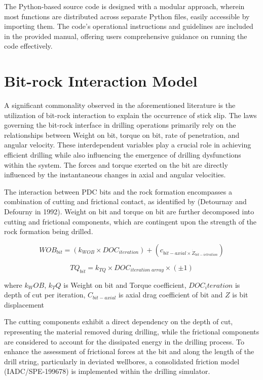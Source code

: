 The Python-based source code is designed with a modular approach, wherein most functions are distributed across separate Python files, easily accessible by importing them. The code's operational instructions and guidelines are included in the provided manual, offering users comprehensive guidance on running the code effectively.

\section{Bit-rock Interaction Model}

A significant commonality observed in the aforementioned literature is the utilization of bit-rock interaction to explain the occurrence of stick slip. The laws governing the bit-rock interface in drilling operations primarily rely on the relationships between Weight on bit, torque on bit, rate of penetration, and angular velocity. These interdependent variables play a crucial role in achieving efficient drilling while also influencing the emergence of drilling dysfunctions within the system. The forces and torque exerted on the bit are directly influenced by the instantaneous changes in axial and angular velocities.

The interaction between PDC bits and the rock formation encompasses a combination of cutting and frictional contact, as identified by (Detournay and Defourny in 1992). Weight on bit and torque on bit are further decomposed into cutting and frictional components, which are contingent upon the strength of the rock formation being drilled.

\begin{equation}\label{WOB}
  WOB_{bit} = (k_{WOB}\times DOC_{iteration}) + (c_{bit-axial\times \dot{Z}_{bit-ietration}})
\end{equation}

\begin{equation}\label{Torque}
  TQ_{bit} = k_{TQ}\times DOC_{iteration\; array}\times (\pm1)
\end{equation}

where $k_WOB$, $k_TQ$ is Weight on bit and Torque coefficient, $DOC_iteration$ is depth of cut per iteration, $C_{bit-axial}$ is axial drag coefficient of bit and $Z$ is bit displacement 

The cutting components exhibit a direct dependency on the depth of cut, representing the material removed during drilling, while the frictional components are considered to account for the dissipated energy in the drilling process. To enhance the assessment of frictional forces at the bit and along the length of the drill string, particularly in deviated wellbores, a consolidated friction model (IADC/SPE-199678) is implemented within the drilling simulator. 


